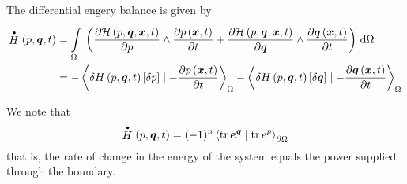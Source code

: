 The differential engery balance is given by
\begin{equation}
  \begin{aligned}
    \dothamiltonian{p,\covectr{q},t}&=\gint{\Omega}{}{\pbrac{\wedgeprod{\delby{\hamiltoniandensity{p,\covectr{q},\vectr{x},t}}{p}}{\delby{\fnof{p}{\vectr{x},t}}{t}}+\wedgeprod{\delby{\hamiltoniandensity{p,\covectr{q},\vectr{x},t}}{\covectr{q}}}{\delby{\fnof{\covectr{q}}{\vectr{x},t}}{t}}}}{\Omega}\\
    &=-\dualityform{\variation{\hamiltonian{p,\covectr{q},t}}{p}}{-\delby{\fnof{p}{\vectr{x},t}}{t}}{\Omega}-\dualityform{\variation{\hamiltonian{p,\covectr{q},t}}{\covectr{q}}}{-\delby{\fnof{\covectr{q}}{\vectr{x},t}}{t}}{\Omega}
  \end{aligned}
\end{equation}

We note that
\begin{equation}
  \dothamiltonian{p,\covectr{q},t}=(-1)^{n}\dualityform{\trace{}{
    \covectr{e}^{\covectr{q}}}}{\trace{}{e^{p}}}{\boundary{\Omega}}
\end{equation}
that is, the rate of change in the energy of the system equals the power
supplied through the boundary. 

